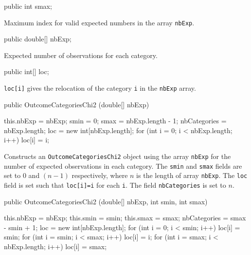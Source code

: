 \begin{code}

      public int smax;
\end{code}
\begin{tabbb} Maximum index for valid expected numbers
   in the array \texttt{nbExp}.
\end{tabbb}
\begin{code}

      public double[] nbExp;
\end{code}
\begin{tabbb} Expected number of observations for each category. \end{tabbb}
\begin{code}

      public int[] loc;
\end{code}
\begin{tabbb} \texttt{loc[i]} gives the relocation of the category \texttt{i} in
   the \texttt{nbExp} array. \end{tabbb}
\begin{code}

      public OutcomeCategoriesChi2 (double[] nbExp)\begin{hide} {
         this.nbExp = nbExp;
         smin = 0;
         smax = nbExp.length - 1;
         nbCategories = nbExp.length;
         loc = new int[nbExp.length];
         for (int i = 0; i < nbExp.length; i++)
            loc[i] = i;
      }\end{hide}
\end{code}
\begin{tabbb}   Constructs an \texttt{OutcomeCategoriesChi2} object
  using the array \texttt{nbExp} for the number of expected observations in
  each category. The \texttt{smin} and \texttt{smax} fields are set to 0 and
  $(n-1)$ respectively, where $n$ is  the length of array \texttt{nbExp}.
  The \texttt{loc} field is set such that \texttt{loc[i]=i} for each \texttt{i}.
  The field \texttt{nbCategories} is set to $n$.
\end{tabbb}
\begin{htmlonly}
\end{htmlonly}
\begin{code}

      public OutcomeCategoriesChi2 (double[] nbExp, int smin, int smax)\begin{hide} {
         this.nbExp = nbExp;
         this.smin = smin;
         this.smax = smax;
         nbCategories = smax - smin + 1;
         loc = new int[nbExp.length];
         for (int i = 0; i < smin; i++)
            loc[i] = smin;
         for (int i = smin; i < smax; i++)
            loc[i] = i;
         for (int i = smax; i < nbExp.length; i++)
            loc[i] = smax;
      }\end{hide}
\end{code}
